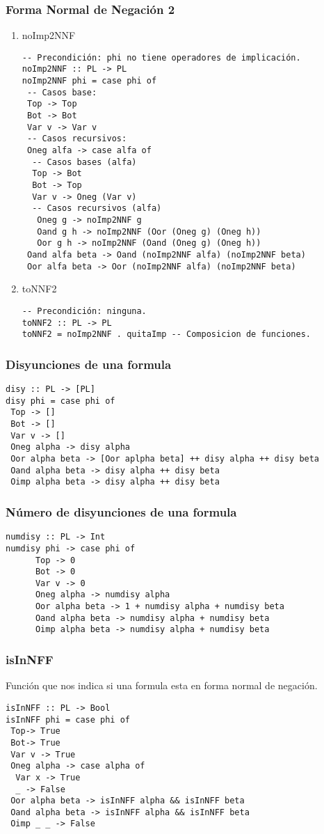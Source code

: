 \documentclass[11pt]{article}
\begin{document}
\subsubsection{Forma Normal de Negación 2}
\label{sec:orgd273ad0}
\begin{enumerate}
\item noImp2NNF
\label{sec:orgc1b016f}
\begin{verbatim}
-- Precondición: phi no tiene operadores de implicación.
noImp2NNF :: PL -> PL
noImp2NNF phi = case phi of
 -- Casos base:
 Top -> Top
 Bot -> Bot
 Var v -> Var v
 -- Casos recursivos:
 Oneg alfa -> case alfa of
  -- Casos bases (alfa)
  Top -> Bot
  Bot -> Top
  Var v -> Oneg (Var v)
  -- Casos recursivos (alfa)
   Oneg g -> noImp2NNF g
   Oand g h -> noImp2NNF (Oor (Oneg g) (Oneg h))
   Oor g h -> noImp2NNF (Oand (Oneg g) (Oneg h))
 Oand alfa beta -> Oand (noImp2NNF alfa) (noImp2NNF beta)
 Oor alfa beta -> Oor (noImp2NNF alfa) (noImp2NNF beta)
\end{verbatim}
\item toNNF2
\label{sec:orga4d350a}
\begin{verbatim}
-- Precondición: ninguna.
toNNF2 :: PL -> PL
toNNF2 = noImp2NNF . quitaImp -- Composicion de funciones.
\end{verbatim}
\end{enumerate}
\subsubsection{Disyunciones de una formula}
\label{sec:orgc9557c3}
\begin{verbatim}
disy :: PL -> [PL]
disy phi = case phi of 
 Top -> []
 Bot -> []
 Var v -> []
 Oneg alpha -> disy alpha 
 Oor alpha beta -> [Oor aplpha beta] ++ disy alpha ++ disy beta 
 Oand alpha beta -> disy alpha ++ disy beta
 Oimp alpha beta -> disy alpha ++ disy beta
\end{verbatim}
\subsubsection{Número de disyunciones de una formula}
\label{sec:org8b29bd7}
\begin{verbatim}
numdisy :: PL -> Int
numdisy phi -> case phi of
      Top -> 0
      Bot -> 0
      Var v -> 0
      Oneg alpha -> numdisy alpha
      Oor alpha beta -> 1 + numdisy alpha + numdisy beta
      Oand alpha beta -> numdisy alpha + numdisy beta
      Oimp alpha beta -> numdisy alpha + numdisy beta  
\end{verbatim}
\subsubsection{isInNFF}
\label{sec:orgb67a2cc}
Función que nos indica si una formula esta en forma normal de negación.
\begin{verbatim}
isInNFF :: PL -> Bool
isInNFF phi = case phi of
 Top-> True
 Bot-> True
 Var v -> True
 Oneg alpha -> case alpha of
  Var x -> True
  _ -> False 
 Oor alpha beta -> isInNFF alpha && isInNFF beta
 Oand alpha beta -> isInNFF alpha && isInNFF beta
 Oimp _ _ -> False
\end{verbatim}
\end{document}
